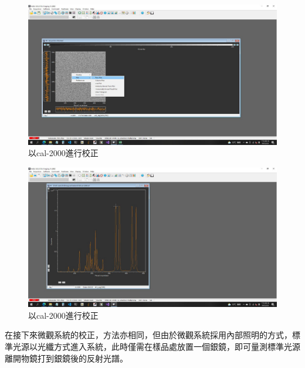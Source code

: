 \documentclass[12pt]{article}
\begin{document}
    \begin{figure}[ht]
        \centering
        \includegraphics[width=\linewidth]{rowPlot.jpeg}
        \caption{以cal-2000進行校正}
        \label{figure: fitting_rowplot}
    \end{figure}
    \begin{figure}[ht]
        \centering
        \includegraphics[width=\linewidth]{HLineProfile.jpeg}
        \caption{以cal-2000進行校正}
        \label{figure: fitting_profile}
    \end{figure}
    在接下來微觀系統的校正，方法亦相同，但由於微觀系統採用內部照明的方式，標準光源以光纖方式進入系統，此時僅需在樣品處放置一個銀鏡，即可量測標準光源離開物鏡打到銀鏡後的反射光譜。
    
\end{document}

